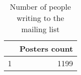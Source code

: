 \begin{table}[ht]
\begin{center}
\begin{tabular}{rr}
  \hline
 & Posters count \\ 
  \hline
1 & 1199 \\ 
   \hline
\end{tabular}
\caption{Number of people writing to the mailing list}
\end{center}
\end{table}
